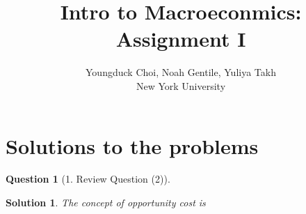 \documentclass{article} %
\title{Intro to Macroeconmics: Assignment I}
\author{
Youngduck Choi, Noah Gentile, Yuliya Takh \\
New York University \\
}
\theoremstyle{quest}
\newtheorem*{question}{Question}
\newtheorem*{solution}{Solution}
\begin{document}
\maketitle

\begin{abstract}
\end{abstract}

\section{Solutions to the problems}

\begin{question}[1. Review Question (2)]
\end{question}
\begin{solution}
The concept of opportunity cost is 
\end{solution}

\bigskip
\end{document}
